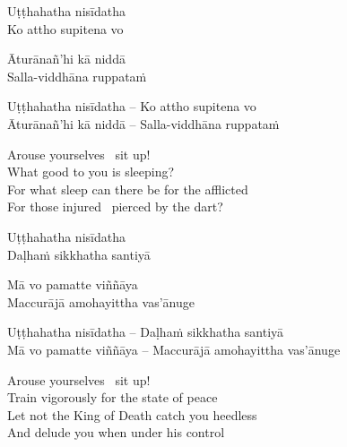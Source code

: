 \suttaRef{[Snp 949]}

\ifninebythirteen

\begin{pali-hang-verses}
  Uṭṭhahatha nisīdatha\\
  Ko attho supitena vo
\end{pali-hang-verses}
\begin{pali-hang-together}
  Āturānañ'hi kā niddā\\
  Salla-viddhāna ruppataṁ
\end{pali-hang-together}

\else

\begin{verses}
  Uṭṭhahatha nisīdatha – Ko attho supitena vo\\
  Āturānañ'hi kā niddā – Salla-viddhāna ruppataṁ
\end{verses}

\fi

\ifninebythirteen\clearpage\fi

\begin{english-verses}
  Arouse yourselves \breathmark\ sit up!\\
  What good to you is sleeping?\\
  For what sleep can there be for the afflicted\\
  For those injured \breathmark\ pierced by the dart?
\end{english-verses}

\ifninebythirteen

\begin{pali-hang-verses}
  Uṭṭhahatha nisīdatha\\
  Daḷhaṁ sikkhatha santiyā
\end{pali-hang-verses}
\begin{pali-hang-together}
  Mā vo pamatte viññāya\\
  Maccurājā amohayittha vas'ānuge
\end{pali-hang-together}

\else

\begin{verses}
  Uṭṭhahatha nisīdatha – Daḷhaṁ sikkhatha santiyā\\
  Mā vo pamatte viññāya – Maccurājā amohayittha vas'ānuge
\end{verses}

\fi

\begin{english-verses}
  Arouse yourselves \breathmark\ sit up!\\
  Train vigorously for the state of peace\\
  Let not the King of Death catch you heedless\\
  And delude you when under his control
\end{english-verses}

